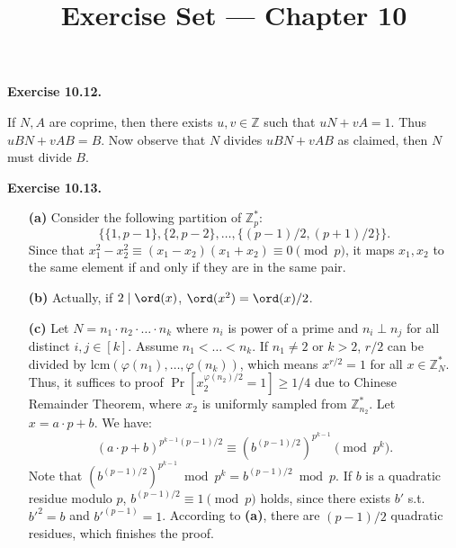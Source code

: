 \documentclass[a4paper]{article}
\title{Exercise Set --- Chapter 10}
\date{}
\newenvironment{exercise}[1]{
	\par
	\noindent\textbf{Exercise #1.}\quad
}{
	\par
	\bigskip
}
\begin{document}
    \maketitle

	\begin{exercise}{10.12}
        If $N,A$ are coprime, then there exists $u,v\in\mathbb Z$ such that $uN+vA=1$.
        Thus $uBN+vAB=B$. Now observe that $N$ divides $uBN+vAB$ as claimed, then $N$ must divide $B$.
	\end{exercise}

	\begin{exercise}{10.13}
		\begin{itemize}
			\item [\textbf{(a)}] Consider the following partition of $\mathbb Z_p^*$:
			\[
				\{\{1, p - 1\}, \{2, p - 2\}, \ldots, \{(p - 1)/2, (p + 1)/2\}\}.
			\]
			Since that $x_1^2 - x_2^2 \equiv (x_1 - x_2)(x_1 + x_2) \equiv 0 \pmod p$, it maps $x_1, x_2$ to the same element if and only if they are in the same pair.

			\item [\textbf{(b)}] Actually, if $2 \mid \ord(x)$, $\ord(x^2) = \ord(x)/2$.

			\item [\textbf{(c)}] Let $N = n_1\cdot n_2 \cdot \ldots \cdot n_k$ where $n_i$ is power of a prime and $n_i \perp n_j$ for all distinct $i, j \in [k]$. Assume $n_1 < \ldots < n_k$. If $n_1 \neq 2$ or $k > 2$, $r / 2$ can be divided by $\text{lcm}(\varphi(n_1), \ldots, \varphi(n_k))$, which means $x^{r/2} = 1$ for all $x \in \mathbb Z_{N}^*$. Thus, it suffices to proof $\Pr[x_2^{\varphi(n_2)/2} = 1] \geq 1/4$ due to Chinese Remainder Theorem, where $x_2$ is uniformly sampled from $\mathbb Z_{n_2}^*$. Let $x = a\cdot p + b$. We have:
			\[
				(a\cdot p + b)^{p^{k - 1}(p - 1)/2} \equiv (b^{(p - 1)/2})^{p^{k - 1}} \pmod {p^k}.
			\]
			Note that $(b^{(p - 1)/2})^{p^{k - 1}} \bmod {p^k} = b^{(p - 1)/2} \bmod p$. If $b$ is a quadratic residue modulo $p$, $b^{(p - 1)/2} \equiv 1 \pmod p$ holds, since there exists $b'$ s.t. $b'^2 = b$ and $b'^{(p - 1)} = 1$. According to \textbf{(a)}, there are $(p - 1)/2$ quadratic residues, which finishes the proof.

		\end{itemize}
	\end{exercise}
\end{document}

